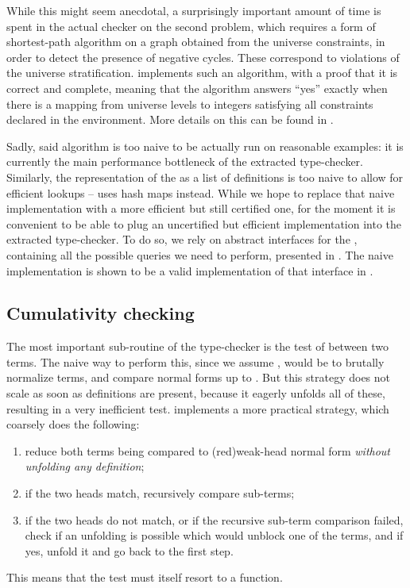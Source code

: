 While this might seem anecdotal,
a surprisingly important amount of time is spent in the actual checker
on the second problem, which requires a form of shortest-path algorithm
on a graph obtained from the universe constraints, in order
to detect the presence of negative cycles.
These correspond to violations of the universe stratification.
 implements such an algorithm, with a proof that it is correct and complete, meaning that
the algorithm answers “yes” exactly when there is a mapping from universe levels to integers satisfying
all constraints declared in the environment.
More details on this can be found in .

Sadly, said algorithm is too naive to be actually run on reasonable examples: it is currently the main
performance bottleneck of the extracted type-checker. Similarly, the representation of the
 as a list of definitions is too naive to allow for efficient lookups –
 uses hash maps instead.
While we hope to replace that naive implementation with a more efficient but still certified one,
for the moment it is convenient to be able to plug an uncertified but efficient implementation
into the extracted type-checker. To do so, we rely on abstract interfaces for the
, containing all the possible queries we need to perform,
presented in . The naive implementation is shown to be a valid implementation of
that interface in .

\subsection{Cumulativity checking}

The most important sub-routine of the type-checker is the test of  between two terms.
The naive way to perform this, since we assume , would be to brutally normalize terms,
and compare normal forms up to .%
But this strategy does not scale as soon as definitions are present, because it
eagerly unfolds all of these, resulting in a very inefficient test.
 implements a more practical strategy, which coarsely does the following:
\begin{enumerate}
  \item reduce both terms being compared to \kl(red){weak-head} normal form
    \emph{without unfolding any definition};
  \item if the two heads match, recursively compare sub-terms;
  \item if the two heads do not match, or if the recursive sub-term comparison failed, check if
    an unfolding is possible which would unblock one of the terms, and if yes, unfold it and
    go back to the first step.
\end{enumerate}
This means that the  test must itself resort to a 
function.


